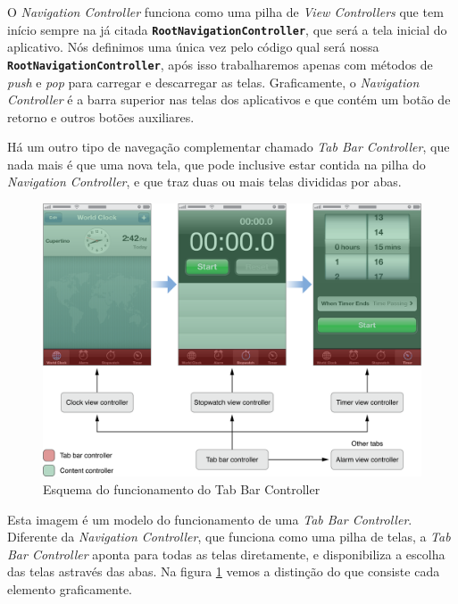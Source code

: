 \documentclass[a4paper,12pt,brazil,doubleside]{book}
\begin{document}
\begin{singlespace}
O \emph{Navigation Controller} funciona como uma pilha de \emph{View Controllers} que tem início sempre na já citada \texttt{\textbf{RootNavigationController}}, que será a tela inicial do aplicativo. Nós definimos uma única vez pelo código qual será nossa \texttt{\textbf{RootNavigationController}}, após isso trabalharemos apenas com métodos de \emph{push} e \emph{pop} para carregar e descarregar as telas. Graficamente, o \emph{Navigation Controller} é a barra superior nas telas dos aplicativos e que contém um botão de retorno e outros botões auxiliares.

Há um outro tipo de navegação complementar chamado \emph{Tab Bar Controller}, que nada mais é que uma nova tela, que pode inclusive estar contida na pilha do \emph{Navigation Controller}, e que traz duas ou mais telas divididas por abas.

\bigskip
\bigskip

\begin{figure}[h]
  \centering
  \includegraphics[width=\textwidth]{figuras/apple_tabbar_interface.png}
  \caption{Esquema do funcionamento do Tab Bar Controller}
  \label{fig:tab_bar_controller}
\end{figure}


Esta imagem é um modelo do funcionamento de uma \emph{Tab Bar Controller}. Diferente da \emph{Navigation Controller}, que funciona como uma pilha de telas, a \emph{Tab Bar Controller} aponta para todas as telas diretamente, e disponibiliza a escolha das telas astravés das abas. Na figura \ref{fig:tab_bar_controller} vemos a distinção do que consiste cada elemento graficamente.

\bigskip
\bigskip



\end{singlespace}
\end{document}

